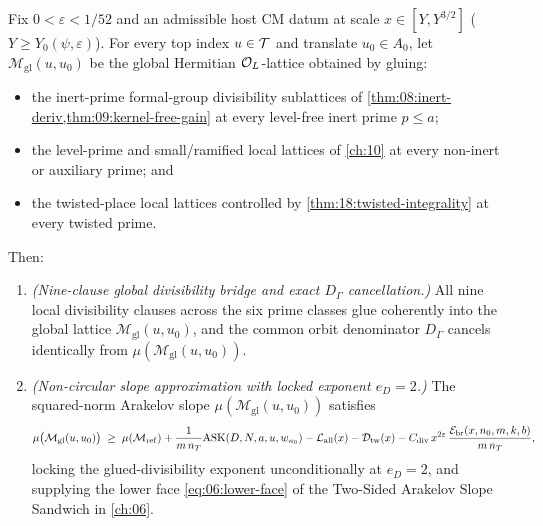 \begin{theorem}[Valuation divisibility, non-circular slope approximation, and Glued Lattice Theorem ($e_D = 2$)]
\label{thm:09:glued-lattice}
Fix $0 < \varepsilon < 1/52$ and an admissible host CM datum at scale $x \in [Y, Y^{3/2}]$ ($Y \ge Y_0(\psi, \varepsilon)$). For every top index $u \in \mathcal{T}$ and translate $u_0 \in A_0$, let $\mathcal{M}_{\mathrm{gl}}(u, u_0)$ be the global Hermitian $\mathcal{O}_L$-lattice obtained by gluing:
\begin{itemize}
\item the inert-prime formal-group divisibility sublattices of \cref{thm:08:inert-deriv,thm:09:kernel-free-gain} at every level-free inert prime $p \le a$;
\item the level-prime and small/ramified local lattices of \cref{ch:10} at every non-inert or auxiliary prime; and
\item the twisted-place local lattices controlled by \cref{thm:18:twisted-integrality} at every twisted prime.
\end{itemize}
Then:
\begin{enumerate}[label=\textup{(\roman*)}]
\item \emph{(Nine-clause global divisibility bridge and exact $D_\Gamma$ cancellation.)} All nine local divisibility clauses across the six prime classes glue coherently into the global lattice $\mathcal{M}_{\mathrm{gl}}(u, u_0)$, and the common orbit denominator $D_\Gamma$ cancels identically from $\mu(\mathcal{M}_{\mathrm{gl}}(u, u_0))$.
\item \emph{(Non-circular slope approximation with locked exponent $e_D = 2$.)} The squared-norm Arakelov slope $\mu(\mathcal{M}_{\mathrm{gl}}(u, u_0))$ satisfies
  \begin{equation}
  \label{eq:09:glued-slope}
    \mu\bigl(\mathcal{M}_{\mathrm{gl}}(u, u_0)\bigr)
    \;\ge\; \mu(\mathcal{M}_{\mathrm{ref}})
    + \frac{1}{m\, n_T}\mathrm{ASK}(D, N, a, u, w_{u_0})
    - \mathcal{L}_{\mathrm{all}}(x)
    - \mathcal{D}_{\mathrm{tw}}(x)
    - C_{\mathrm{div}}\, x^{2\varepsilon}\,\frac{\mathcal{E}_{\mathrm{br}}(x, n_0, m, k, b)}{m\, n_T},
  \end{equation}
  locking the glued-divisibility exponent unconditionally at $e_D = 2$, and supplying the lower face \eqref{eq:06:lower-face} of the Two-Sided Arakelov Slope Sandwich in \cref{ch:06}.
\end{enumerate}
\end{theorem}

